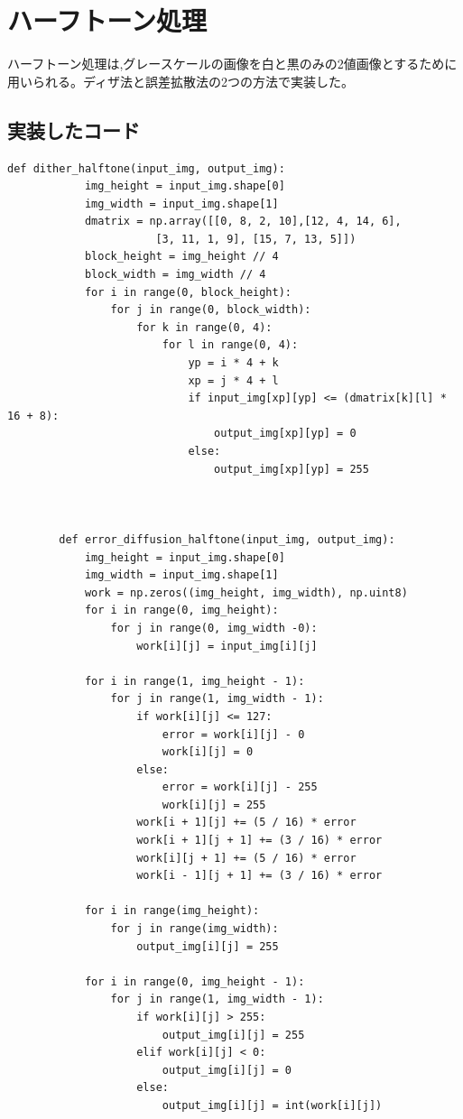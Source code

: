 \documentclass[11pt,a4j]{jsarticle}
\begin{document}
    \section{ハーフトーン処理}
    ハーフトーン処理は,グレースケールの画像を白と黒のみの2値画像とするために用いられる。ディザ法と誤差拡散法の2つの方法で実装した。
    \subsection{実装したコード}
    \begin{lstlisting}[basicstyle=\ttfamily\footnotesize, frame=single]
        def dither_halftone(input_img, output_img):
            img_height = input_img.shape[0]
            img_width = input_img.shape[1]
            dmatrix = np.array([[0, 8, 2, 10],[12, 4, 14, 6],
            　　　　　　 [3, 11, 1, 9], [15, 7, 13, 5]])
            block_height = img_height // 4
            block_width = img_width // 4
            for i in range(0, block_height):
                for j in range(0, block_width):
                    for k in range(0, 4):
                        for l in range(0, 4):
                            yp = i * 4 + k
                            xp = j * 4 + l
                            if input_img[xp][yp] <= (dmatrix[k][l] * 16 + 8):
                                output_img[xp][yp] = 0
                            else:
                                output_img[xp][yp] = 255



        def error_diffusion_halftone(input_img, output_img):
            img_height = input_img.shape[0]
            img_width = input_img.shape[1]
            work = np.zeros((img_height, img_width), np.uint8)
            for i in range(0, img_height):
                for j in range(0, img_width -0):
                    work[i][j] = input_img[i][j]

            for i in range(1, img_height - 1):
                for j in range(1, img_width - 1):
                    if work[i][j] <= 127:
                        error = work[i][j] - 0
                        work[i][j] = 0
                    else:
                        error = work[i][j] - 255
                        work[i][j] = 255
                    work[i + 1][j] += (5 / 16) * error
                    work[i + 1][j + 1] += (3 / 16) * error
                    work[i][j + 1] += (5 / 16) * error
                    work[i - 1][j + 1] += (3 / 16) * error

            for i in range(img_height):
                for j in range(img_width):
                    output_img[i][j] = 255

            for i in range(0, img_height - 1):
                for j in range(1, img_width - 1):
                    if work[i][j] > 255:
                        output_img[i][j] = 255
                    elif work[i][j] < 0:
                        output_img[i][j] = 0
                    else:
                        output_img[i][j] = int(work[i][j])
    \end{lstlisting}
\end{document}
